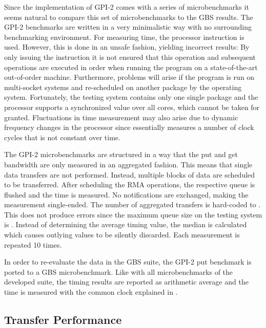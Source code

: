 Since the implementation of \ac{GPI}-2 comes with a series of microbenchmarks it seems natural to compare this set of microbenchmarks to the \ac{GBS} results. The \ac{GPI}-2 benchmarks are written in a very minimalistic way with no surrounding benchmarking environment. For measuring time, the processor instruction  is used. However, this is done in an unsafe fashion, yielding incorrect results: By only issuing the  instruction it is not ensured that this operation and subsequent operations are executed in order when running the program on a state-of-the-art out-of-order machine. Furthermore, problems will arise if the program is run on multi-socket systems and re-scheduled on another package by the operating system. Fortunately, the testing system contains only one single package and the processor supports a synchronized  value over all cores, which cannot be taken for granted. Fluctuations in time measurement may also arise due to dynamic frequency changes in the processor since  essentially measures a number of clock cycles that is not constant over time.

The \ac{GPI}-2 microbenchmarks are structured in a way that the put and get bandwidth are only measured in an aggregated fashion. This means that single data transfers are not performed. Instead, multiple blocks of data are scheduled to be transferred. After scheduling the \ac{RMA} operations, the respective queue is flushed and the time is measured. No notifications are exchanged, making the measurement single-ended. The number of aggregated transfers is hard-coded to . This does not produce errors since the maximum queue size on the testing system is . Instead of determining the average timing value, the median is calculated which causes outlying values to be silently discarded. Each measurement is repeated 10 times.

In order to re-evaluate the data in the \ac{GBS} suite, the \ac{GPI}-2 put benchmark is ported to a \ac{GBS} microbenchmark. Like with all microbenchmarks of the developed suite, the timing results are reported as arithmetic average and the time is measured with the common clock explained in .



\subsection{Transfer Performance}

